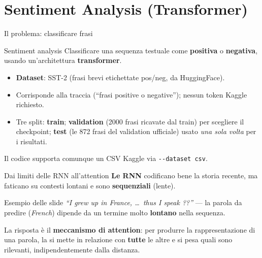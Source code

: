 \documentclass[aspectratio=169]{beamer}
\begin{document}
\section{Sentiment Analysis (Transformer)}

\begin{frame}{Il problema: classificare frasi}
  \begin{block}{Sentiment analysis}
    Classificare una sequenza testuale come \textbf{positiva} o \textbf{negativa},
    usando un'architettura \textbf{transformer}.
  \end{block}
  \vspace{0.3cm}
  \begin{itemize}
    \item \textbf{Dataset}: SST-2 (frasi brevi etichettate pos/neg, da HuggingFace).
    \item Corrisponde alla traccia (``frasi positive o negative''); nessun token Kaggle richiesto.
    \item Tre split: \textbf{train}; \textbf{validation} (2000 frasi ricavate dal
          train) per scegliere il checkpoint; \textbf{test} (le 872 frasi del
          validation ufficiale) usato \emph{una sola volta} per i risultati.
  \end{itemize}
  \begin{center}
    \small Il codice supporta comunque un CSV Kaggle via \texttt{-{}-dataset csv}.
  \end{center}
\end{frame}

\begin{frame}{Dai limiti delle RNN all'attention}
  \textbf{Le RNN} codificano bene la storia recente, ma faticano su contesti
  lontani e sono \textbf{sequenziali} (lente).
  \begin{block}{Esempio delle slide}
    \emph{``I grew up in France, \dots\ thus I speak ??''} --- la parola da predire
    (\emph{French}) dipende da un termine molto \textbf{lontano} nella sequenza.
  \end{block}
  \vspace{0.2cm}
  La risposta è il \textbf{meccanismo di attention}: per produrre la
  rappresentazione di una parola, la si mette in relazione con \textbf{tutte} le
  altre e si pesa quali sono rilevanti, indipendentemente dalla distanza.
\end{frame}
\end{document}
